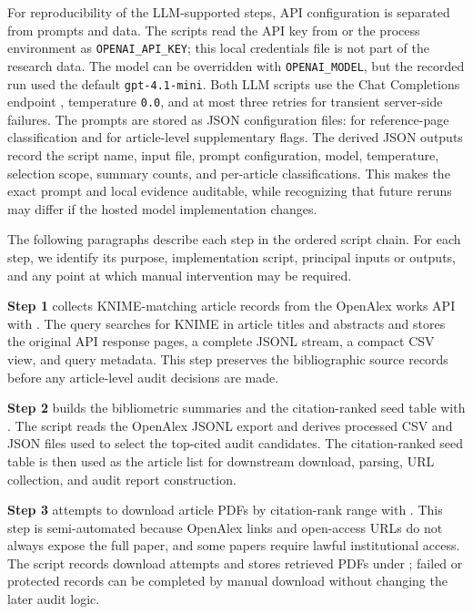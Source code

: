 \documentclass[runningheads]{llncs}
\begin{document}
For reproducibility of the LLM-supported steps, API configuration is separated
from prompts and data. The scripts read the API key from  or the
process environment as \texttt{OPENAI\_API\_KEY}; this local credentials file
is not part of the research data. The model can be overridden with
\texttt{OPENAI\_MODEL}, but the recorded run used the default
\texttt{gpt-4.1-mini}. Both LLM scripts use the Chat Completions endpoint
, temperature \texttt{0.0},
and at most three retries for transient server-side failures. The prompts are
stored as JSON configuration files:
 for
reference-page classification and
 for
article-level supplementary flags. The derived JSON outputs record the script
name, input file, prompt configuration, model, temperature, selection scope,
summary counts, and per-article classifications. This makes the exact prompt
and local evidence auditable, while recognizing that future reruns may differ
if the hosted model implementation changes.

The following paragraphs describe each step in the ordered script chain. For
each step, we identify its purpose, implementation script, principal inputs or
outputs, and any point at which manual intervention may be required.

\textbf{Step 1} collects KNIME-matching article records from the OpenAlex works API with
. The query searches for KNIME in
article titles and abstracts and stores the original API response pages, a
complete JSONL stream, a compact CSV view, and query metadata. This step
preserves the bibliographic source records before any article-level audit
decisions are made.

\textbf{Step 2} builds the bibliometric summaries and the citation-ranked seed table
with . The script reads the
OpenAlex JSONL export and derives processed CSV and JSON files used to select
the top-cited audit candidates. The citation-ranked seed table is then used as
the article list for downstream download, parsing, URL collection, and audit
report construction.

\textbf{Step 3} attempts to download article PDFs by citation-rank range with
. This step is
semi-automated because OpenAlex links and open-access URLs do not always expose
the full paper, and some papers require lawful institutional access. The script
records download attempts and stores retrieved PDFs under
; failed or protected records can be completed by
manual download without changing the later audit logic.
\end{document}
